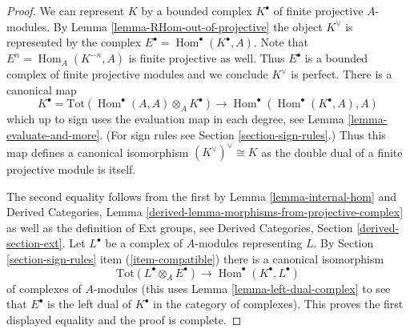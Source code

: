 \documentclass[10pt,a4paper]{amsart}
\theoremstyle{plain}
\theoremstyle{definition}
\theoremstyle{remark}
\numberwithin{equation}{subsection}
\def\Hom{\mathop{\mathrm{Hom}}\nolimits}
\begin{document}
\begin{proof}
We can represent $K$ by a bounded complex $K^\bullet$ of finite projective
$A$-modules. By Lemma \ref{lemma-RHom-out-of-projective} the object $K^\vee$
is represented by the complex $E^\bullet = \Hom^\bullet(K^\bullet, A)$.
Note that $E^n = \Hom_A(K^{-n}, A)$ is finite projective as well.
Thus $E^\bullet$ is a bounded complex of finite projective modules
and we conclude $K^\vee$ is perfect. There is a canonical map
$$
K^\bullet = \text{Tot}(\Hom^\bullet(A, A) \otimes_A K^\bullet)
\longrightarrow
\Hom^\bullet(\Hom^\bullet(K^\bullet, A), A)
$$
which up to sign uses the evaluation map in each degree,
see Lemma \ref{lemma-evaluate-and-more}. (For sign rules see
Section \ref{section-sign-rules}.)
Thus this map defines a canonical isomorphism $(K^\vee)^\vee \cong K$
as the double dual of a finite projective module is itself.

\medskip\noindent
The second equality follows from the first by
Lemma \ref{lemma-internal-hom} and
Derived Categories, Lemma \ref{derived-lemma-morphisms-from-projective-complex}
as well as the definition of Ext groups, see
Derived Categories, Section \ref{derived-section-ext}.
Let $L^\bullet$ be a complex of $A$-modules representing $L$.
By Section \ref{section-sign-rules} item (\ref{item-compatible})
there is a canonical isomorphism
$$
\text{Tot}(L^\bullet \otimes_A E^\bullet)
\longrightarrow
\Hom^\bullet(K^\bullet, L^\bullet)
$$
of complexes of $A$-modules (this uses Lemma \ref{lemma-left-dual-complex}
to see that $E^\bullet$ is the left dual of $K^\bullet$ in the category
of complexes). This proves the first displayed equality
and the proof is complete.
\end{proof}
\end{document}
